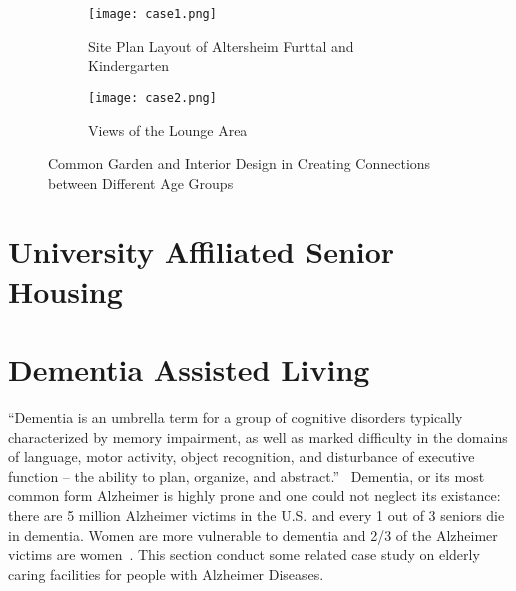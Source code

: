 \begin{figure}
\centering
\begin{subfigure}{0.7\textwidth}
  \centering
  \texttt{[image: case1.png]}
  \caption{Site Plan Layout of Altersheim Furttal and Kindergarten}
  \label{fig:case1}
\end{subfigure}
\begin{subfigure}{0.7\textwidth}
  \centering
  \texttt{[image: case2.png]}
  \caption{Views of the Lounge Area}
  \label{fig:case2}
\end{subfigure}
\caption{Common Garden and Interior Design in Creating Connections
  between Different Age Groups}
\label{fig:case2}
\end{figure}
\section{University Affiliated Senior Housing}
\section{Dementia Assisted Living}
``Dementia is an umbrella term for a group of cognitive disorders
typically characterized by memory impairment, as well as marked
difficulty in the domains of language, motor activity, object
recognition, and disturbance of executive function – the ability to
plan, organize, and abstract.''~\cite{CDCdementia} Dementia, or its
most common form Alzheimer is highly prone and one could not neglect
its existance: there are 5 million Alzheimer victims in the U.S. and
every 1 out of 3 seniors die in dementia. Women are more vulnerable to
dementia and 2/3 of the Alzheimer victims are
women~\cite{alzorg2014}. This section conduct some related case study
on elderly caring facilities for people with Alzheimer Diseases. 

